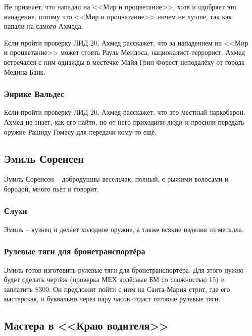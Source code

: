 \documentclass{article}
\begin{document}
Не признаёт, что нападал на <<Мир и процветание>>, хотя и одобряет это
нападение, потому что <<Мир и процветание>> ничем не лучше, так как напали
на самого Ахмеда.

Если пройти проверку ЛИД 20, Ахмед расскажет, что за нападением на <<Мир
и процветание>> может стоять Рауль Мендоса, националист-террорист. Ахмед
встречался с ним однажды в местечке Майя Грин Форест неподалёку от
города Медина-Банк.

\subsubsection{Энрике
Вальдес}\label{enrique-valdes}

Если пройти проверку ЛИД 20, Ахмед расскажет, что это местный
наркобарон. Ахмед не знает, как его найти, но от него приходили люди и
просили передать оружие Рашиду Гомесу для передачи кому-то ещё.

\subsection{Эмиль
Соренсен}\label{emil-sorensen}

Эмиль Соренсен -- добродушны весельчак, полный, с рыжими волосами и
бородой, много пьёт и говорит.

\subsubsection{Слухи}\label{rumors-sorensen}

Эмиль -- кузнец и делает холодное оружие, а также всякие изделия из
металла.

\subsubsection{Рулевые тяги для
бронетранспортёра}\label{apc-steering-tie-rods}

Эмиль готов изготовить рулевые тяги для бронетранспортёра. Для этого
нужно будет сделать чертёж (проверка МЕХ колёсные БМ со сложностью 15) и
заплатить \$300. Он предложит пойти с ним на Санта-Мария стрит, где его
мастерская, и буквально через пару часов отдаст готовые рулевые тяги.

\subsection{Мастера в <<Краю
водителя>>}\label{mechanics-drivers-edge}
\end{document}
